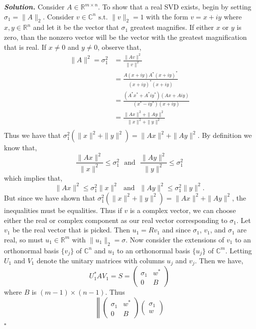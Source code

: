 \documentclass[12pt]{report}
\newenvironment{solution}[1][\it{Solution}]{\textbf{#1. } }{$\square$}
\def\C{{\mathbb C}}
\def\R{{\mathbb R}}
\begin{document}
\begin{solution}
    \noindent
    Consider $A \in \R^{m \times n}$. To show that a real SVD exists, begin by setting $\sigma_1 = \| A \|_2$. Consider $v \in \C^{n} \text{ s.t. } \|v\|_2 = 1$ with the form $v = x + iy$ where $x,y \in \R^n$ and let it be the vector that $\sigma_1$ greatest magnifies. If either $x$ or $y$ is zero, than the nonzero vector will be the vector with the greatest magnification that is real. If $x \neq 0$ and $y \neq 0$, observe that,
    \begin{align*}
        \|A\|^2 = \sigma_1^2 &= \frac{\|Av\|^2}{\|v\|^2}\\
        &= \frac{A(x+iy)A^*(x + iy)^*}{(x+iy)^*(x+iy)}\\
        &= \frac{(A^*x^* + A^*iy^*)(Ax+Aiy)}{(x^*-iy^*)(x+iy)}\\
        &= \frac{\|Ax\|^2 + \|Ay\|^2}{\|x\|^2 + \|y\|^2}\\ 
    \end{align*}
    Thus we have that $\sigma_1^2(\|x\|^2 + \|y\|^2) = \|Ax\|^2 + \|Ay\|^2$. 
    By definition we know that,
    \[
        \frac{\|Ax\|^2}{\|x\|^2} \leq \sigma_1^2 ~~~\text{and}~~~ \frac{\|Ay\|^2}{\|y\|^2} \leq \sigma_1^2
    \]
    which implies that,
    \[
        \|Ax\|^2 \leq \sigma_1^2\|x\|^2 ~~~\text{and}~~~ \|Ay\|^2 \leq \sigma_1^2\|y\|^2.
    \]
    But since we have shown that $\sigma_1^2(\|x\|^2 + \|y\|^2) = \|Ax\|^2 + \|Ay\|^2$, the inequalities must be equalities. Thus if $v$ is a complex vector, we can choose either the real or complex component as our real vector corresponding to $\sigma_1$. Let $v_1$ be the real vector that is picked. Then $u_1= Rv_1$ and since $\sigma_1$, $v_1$, and $\sigma_1$ are real, so must $u_1 \in \R^m$ with $\|u_1\|_2 = \sigma$. Now consider the extensions of $v_1$ to an orthonormal basis $\{v_j\}$ of $\C^n$ and $u_1$ to an orthonormal basis $\{u_j\}$ of $\C^m$. Letting $U_1$ and $V_1$ denote the unitary matrices with columns $u_j$ and $v_j$. Then we have,
    \[
        U^*_1AV_1 = S = \begin{pmatrix}
            \sigma_1 & w^* \\ 0 & B
        \end{pmatrix}
    \]
    where $B$ is $(m-1)\times (n-1)$. Thus
    \[
        \left\| \begin{pmatrix}
            \sigma_1 & w^* \\ 0 & B
        \end{pmatrix}\begin{pmatrix}
            \sigma_1 \\ w

\end{pmatrix}\]
\end{solution}
\end{document}
